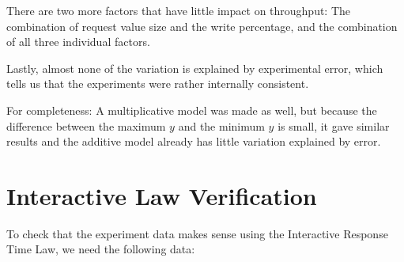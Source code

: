 \documentclass[11pt]{article}
\begin{document}
There are two more factors that have little impact on throughput: The combination of request value size and the write percentage, and the combination of all three individual factors.

Lastly, almost none of the variation is explained by experimental error, which tells us that the experiments were rather internally consistent.

For completeness: A multiplicative model was made as well, but because the difference between the maximum $y$ and the minimum $y$ is small, it gave similar results and the additive model already has little variation explained by error.

% 
% 
% 

\section{Interactive Law Verification}\label{sec:interactive-law}



To check that the experiment data makes sense using the Interactive Response Time Law, we need the following data:
\end{document}
